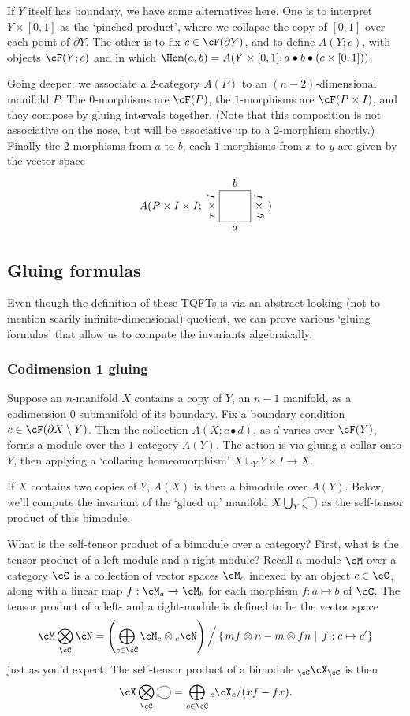\documentclass[11pt]{amsart}
\theoremstyle{plain}
\newcommand{\selfarrow}{\ensuremath{\smash{\tikz[baseline]{\clip (0,0.36) rectangle (0.48,-0.16); \draw[->] (0,0.175) .. controls (0.6,0.65) and (0.6,-0.45) .. (0,0.025);}}}}
\newcommand{\bdy}{\partial}
\newcommand{\tensor}{\otimes}
\newcommand{\Tensor}{\bigotimes}
\newcommand{\DirectSum}{\bigoplus}
\newcommand{\setc}[2]{\setcl{#1}{#2}}
\newcommand{\setcl}[2]{\left\{ \left. #1 \;\right| \; #2 \right\}}
\begin{document}
If $Y$ itself has boundary, we have some alternatives here. One is to interpret $Y \times [0,1]$ as the `pinched product', where we collapse the copy of $[0,1]$ over each point of $\bdy Y$. The other is to fix $c \in \cF(\bdy Y)$, and to define $A(Y; c)$, with objects $\cF(Y; c)$ and in which $\Hom(a,b) = A(Y \times [0,1]; a \bullet b \bullet (c \times [0,1]))$.

Going deeper, we associate a $2$-category $A(P)$ to an $(n-2)$-dimensional manifold $P$. The $0$-morphisms are $\cF(P)$, the $1$-morphisms are $\cF(P \times I)$, and they compose by gluing intervals together. (Note that this composition is not associative on the nose, but will be associative up to a $2$-morphism shortly.) Finally the $2$-morphisms from $a$ to $b$, each $1$-morphisms from $x$ to $y$ are given by the vector space
$$A(P \times I \times I; \tikz[baseline=11.5]{\draw (0,0) -- node[below] {$a$} (1,0) -- node[below, sloped] {$y \times I$} (1,1) -- node[above] {$b$} (0,1) (0,0) -- node[above,sloped] {$x \times I$} (0,1);})$$ 

\subsection{Gluing formulas}
Even though the definition of these TQFTs is via an abstract looking (not to mention scarily infinite-dimensional) quotient, we can prove various `gluing formulas' that allow us to compute the invariants algebraically.

\subsubsection{Codimension 1 gluing}

Suppose an $n$-manifold $X$ contains a copy of $Y$, an $n-1$ manifold, as a codimension $0$ submanifold of its boundary. Fix a boundary condition $c \in \cF(\bdy X \setminus Y)$. Then the collection $A(X; c \bullet d)$, as $d$ varies over $\cF(Y)$, forms a module over the $1$-category $A(Y)$. The action is via gluing a collar onto $Y$, then applying a `collaring homeomorphism' $X \cup_Y Y \times I \to X$.

If $X$ contains two copies of $Y$, $A(X)$ is then a bimodule over $A(Y)$. Below, we'll compute the invariant of the `glued up' manifold $X \bigcup_Y \selfarrow$ as the self-tensor product of this bimodule.

What is the self-tensor product of a bimodule over a category? First, what is the tensor product of a left-module and a right-module? Recall a module $\cM$ over a category $\cC$ is a collection of vector spaces $\cM_c$ indexed by an object $c \in \cC$, along with a linear map $f: \cM_a \to \cM_b$ for each morphism $f:a \mapsto b$ of $\cC$. The tensor product of a left- and a right-module is defined to be the vector space
$$\cM \Tensor_\cC \cN = \left(\DirectSum_{c \in \cC} \cM_c \tensor {}_c\cN\right) \Big/ \setc{mf \tensor n - m \tensor fn}{f: c \mapsto c'}$$
just as you'd expect. The self-tensor product of a bimodule ${}_{\cC}\cX_{\cC}$ is then
$$\cX \Tensor_{\cC} \selfarrow = \DirectSum_{c \in \cC} {}_c \cX_c / (xf - fx).$$ 
\end{document}
